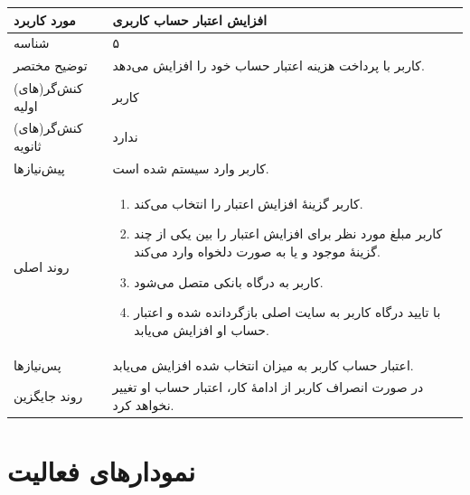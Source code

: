 \documentclass{article}
\begin{document}
\begin{center}
\bgroup
\def\arraystretch{1.5}
\begin{tabular} {|p{}|p{}|}
\hline
 مورد کاربرد & 
افزایش اعتبار حساب کاربری
\\ \hline
 شناسه &
۵
\\ \hline
توضیح مختصر &
کاربر با پرداخت هزینه اعتبار حساب خود را افزایش می‌دهد.
\\ \hline
کنش‌گر(های) اولیه &
کاربر
\\ \hline
کنش‌گر(های) ثانویه &
ندارد
\\ \hline
پیش‌نیازها &
کاربر وارد سیستم شده است.
\\ \hline
روند اصلی &
\begin{enumerate}[nosep,topsep=0cm]
\item
کاربر گزینهٔ افزایش اعتبار را انتخاب می‌کند.
\item
کاربر مبلغ مورد نظر برای افزایش اعتبار را بین یکی از چند گزینهٔ موجود و یا به صورت دلخواه وارد می‌کند.
\item
کاربر به درگاه بانکی متصل می‌شود.
\item
با تایید درگاه کاربر به سایت اصلی بازگردانده شده و اعتبار حساب او افزایش می‌یابد.
\end{enumerate}
\\ \hline
پس‌نیازها &
اعتبار حساب کاربر به میزان انتخاب شده افزایش می‌یابد.
\\ \hline
روند جایگزین &
در صورت انصراف کاربر از ادامهٔ کار، اعتبار حساب او تغییر نخواهد کرد.
\\ \hline
\end{tabular}
\egroup
\end{center}

\newpage

\section{نمودارهای فعالیت}
\end{document}
